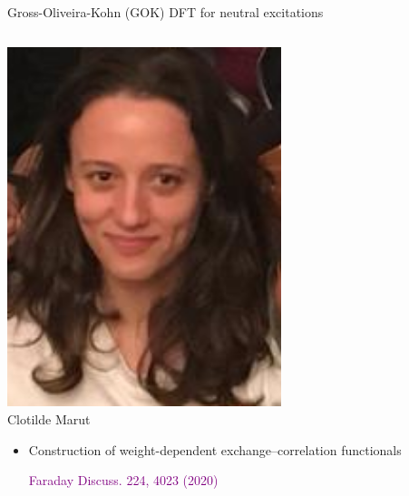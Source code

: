\documentclass[aspectratio=169,9pt]{beamer}
\newcommand{\pub}[1]{{\small \textcolor{purple}{#1}}}
\begin{document}
\begin{frame}{Gross-Oliveira-Kohn (GOK) DFT for neutral excitations}
\begin{columns}
        \begin{column}{0.25\textwidth}
\centering
\includegraphics[width=0.6\textwidth]{fig/Clotilde}
\\
Clotilde Marut
\bigskip

	\begin{itemize}
	\item Construction of weight-dependent exchange–correlation functionals

	\pub{Faraday Discuss. 224, 4023 (2020)}
	\end{itemize}
        \end{column}
        \end{columns}

\end{frame}
\end{document}
